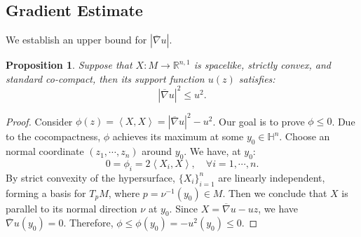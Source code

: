 \documentclass[10pt,a4paper]{amsart}
\newtheorem{proposition}[theorem]{Proposition}
\newcommand{\abs}[1]{\left\lvert{#1}\right\rvert}
\newcommand{\R}{\ensuremath{\mathbb{R}}}
\renewcommand{\H}{{\mathbb{H}}}
\newcommand{\ip}[2]{\ensuremath{\left< {#1}, {#2} \right>}}
\newcommand{\bnabla}{\overline{\nabla}}
\numberwithin{equation}{section}
\begin{document}
\subsection{Gradient Estimate}
We establish an upper bound for \(\abs{\bnabla u}\).
\begin{proposition}\label{prop:gradient-estimate}
    Suppose that \(X:M\to \R^{n,1}\) is spacelike, strictly convex, and standard co-compact, then its support function \(u(z)\) satisfies:
    \begin{equation}\label{eq:gradient-estimate}
        \abs{\bnabla u}^2 \leq u^2.
    \end{equation}
\end{proposition}
\begin{proof}
    Consider \( \phi(z) = \ip{X}{X} = \abs{\bnabla u}^2 - u^2 \). Our goal is to prove \(\phi \leq 0\). Due to the cocompactness, \(\phi\) achieves its maximum at some \(y_0 \in \H^n\). Choose an normal coordinate \((z_1,\cdots,z_n)\) around \(y_0\). We have, at \(y_0\):  
    \[ 0 = \phi_i = 2\ip{X_i}{X}, \quad \forall i=1,\cdots,n.  \]
    By strict convexity of the hypersurface, \(\{X_i\}_{i=1}^n\) are linearly independent, forming a basis for \(T_p M\), where \(p = \nu^{-1}(y_0)\in M\). Then we conclude that \(X\) is parallel to its normal direction \(\nu\) at \(y_0\). Since \(X = \bnabla u - uz\), we have \(\bnabla u (y_0) = 0\). Therefore, \(\phi \leq \phi(y_0) = -u^2(y_0)\leq 0\).

\end{proof}
\end{document}
